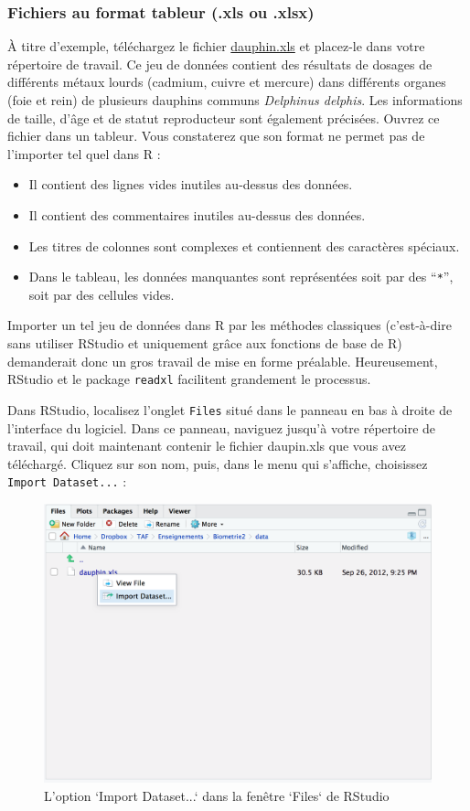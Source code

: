 \documentclass[a4paperpaper,]{article}
\providecommand{\tightlist}{%
  \setlength{\itemsep}{0pt}\setlength{\parskip}{0pt}}
\begin{document}
\hypertarget{tableur}{%
\subsubsection{Fichiers au format tableur (.xls ou .xlsx)}\label{tableur}}

À titre d'exemple, téléchargez le fichier \href{data/dauphin.xls}{dauphin.xls} et placez-le dans votre répertoire de travail. Ce jeu de données contient des résultats de dosages de différents métaux lourds (cadmium, cuivre et mercure) dans différents organes (foie et rein) de plusieurs dauphins communs \emph{Delphinus delphis}. Les informations de taille, d'âge et de statut reproducteur sont également précisées. Ouvrez ce fichier dans un tableur. Vous constaterez que son format ne permet pas de l'importer tel quel dans R :

\begin{itemize}
\tightlist
\item
  Il contient des lignes vides inutiles au-dessus des données.
\item
  Il contient des commentaires inutiles au-dessus des données.
\item
  Les titres de colonnes sont complexes et contiennent des caractères spéciaux.
\item
  Dans le tableau, les données manquantes sont représentées soit par des ``\texttt{*}'', soit par des cellules vides.
\end{itemize}

Importer un tel jeu de données dans R par les méthodes classiques (c'est-à-dire sans utiliser RStudio et uniquement grâce aux fonctions de base de R) demanderait donc un gros travail de mise en forme préalable. Heureusement, RStudio et le package \texttt{readxl} facilitent grandement le processus.

Dans RStudio, localisez l'onglet \texttt{Files} situé dans le panneau en bas à droite de l'interface du logiciel. Dans ce panneau, naviguez jusqu'à votre répertoire de travail, qui doit maintenant contenir le fichier daupin.xls que vous avez téléchargé. Cliquez sur son nom, puis, dans le menu qui s'affiche, choisissez \texttt{Import\ Dataset...} :

\begin{figure}[htpb]

{\centering \includegraphics[width=0.7\linewidth]{images/import} 

}

\caption{L'option `Import Dataset...` dans la fenêtre `Files` de RStudio}\label{fig:import}
\end{figure}
\end{document}
